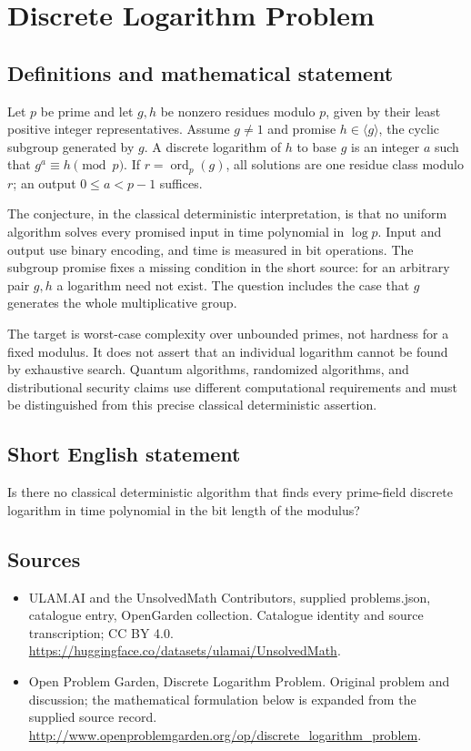 \documentclass[11pt,a4paper]{article}
\begin{document}
\section*{Discrete Logarithm Problem}\label{statement}

\subsection{Definitions and mathematical statement}
Let $p$ be prime and let $g,h$ be nonzero residues modulo $p$, given
by their least positive integer representatives. Assume $g\ne1$
and promise $h\in\langle g\rangle$, the cyclic subgroup generated
by $g$. A discrete logarithm of $h$ to base $g$ is an integer $a$
such that $g^a\equiv h\pmod p$. If $r=\operatorname{ord}_p(g)$,
all solutions are one residue class modulo $r$; an output
$0\le a<p-1$ suffices.

The conjecture, in the classical deterministic interpretation, is
that no uniform algorithm solves every promised input in time
polynomial in $\log p$. Input and output use binary encoding, and
time is measured in bit operations. The subgroup promise fixes a
missing condition in the short source: for an arbitrary pair $g,h$
a logarithm need not exist. The question includes the case that $g$
generates the whole multiplicative group.

The target is worst-case complexity over unbounded primes, not
hardness for a fixed modulus. It does not assert that an individual
logarithm cannot be found by exhaustive search. Quantum algorithms,
randomized algorithms, and distributional security claims use
different computational requirements and must be distinguished from
this precise classical deterministic assertion.
\subsection{Short English statement}
Is there no classical deterministic algorithm that finds every prime-field discrete logarithm in time polynomial in the bit length of the modulus?
\subsection{Sources}
\begin{itemize}
\item[S1] ULAM.AI and the UnsolvedMath Contributors, supplied problems.json, catalogue entry, OpenGarden collection. Catalogue identity and source transcription; CC BY 4.0.
\url{https://huggingface.co/datasets/ulamai/UnsolvedMath}.
\item[S2] Open Problem Garden, Discrete Logarithm Problem. Original problem and discussion; the mathematical formulation below is expanded from the supplied source record.
\url{http://www.openproblemgarden.org/op/discrete_logarithm_problem}.
\end{itemize}
\end{document}
